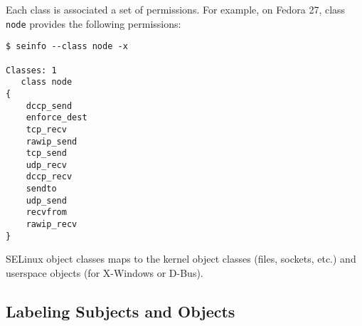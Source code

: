 Each class is associated a set of permissions. For example, on Fedora 27, class
\texttt{node} provides the following permissions:
\begin{lstlisting}
$ seinfo --class node -x

Classes: 1
   class node
{
	dccp_send
	enforce_dest
	tcp_recv
	rawip_send
	tcp_send
	udp_recv
	dccp_recv
	sendto
	udp_send
	recvfrom
	rawip_recv
}
\end{lstlisting}
SELinux object classes maps to the kernel object classes (files, sockets, etc.)
and userspace objects (for X-Windows or D-Bus).

\subsection{Labeling Subjects and Objects}

